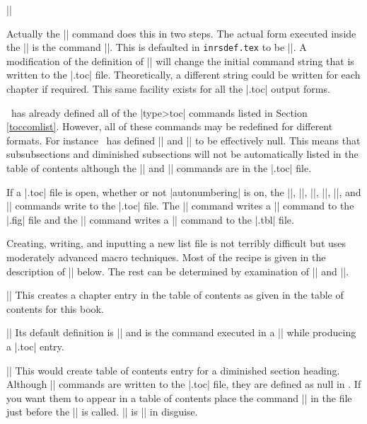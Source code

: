 ||

Actually the |\chead| command does this in two steps. The actual form
executed inside the |\chead| is the command |\chtocout|. This is defaulted in
{\tt inrsdef.tex} to be |\def\chtocout{\string\chtoc}|. A modification of the
definition of |\chtocout| will change the initial command string that is
written to the |.toc| file. Theoretically, a different string could be
written for each chapter if required. This same facility exists for all  the
|.toc| output forms. 

\intex\ has already defined all of the |\<type>toc| commands listed in
Section \ref{toccomlist}. However, all of these commands may be redefined for
different formats. For instance \intex\ has defined |\dssstoc| and |\ssstoc|
to be effectively null. This means that subsubsections and diminished
subsections will not be automatically listed in the table of contents
although the |\ssstoc| and |\dssstoc| commands are in the |.toc| file. 

If a |.toc| file is open, whether or not |autonumbering| is on, the |\chead|,
|\shead|, |\sshead|, |\ssshead|, |\dssshead|, and |\preludehead| commands write to
the |.toc| file. The |\figure| command writes a |\figtoc| command to the
|.fig| file and the |\table| command writes a |\tbltoc| command to the |.tbl|
file. 

Creating, writing, and inputting a new list file is not terribly difficult
but uses moderately advanced macro techniques. Most of the recipe is given 
in the description of |\writelistfile| below. The rest can be determined by
examination of |\makefiglist| and ||. 

\beginblockmode
\ext\@||
\nbr
This creates a chapter entry in the table of contents as given in the table
of contents for this book.

\mbr
\ext\@|\chtocout|
\nbr
Its default definition is
|\def\chtocout{\string\chtoc}| and is 
the command executed in a |\chead| while producing a |.toc| entry. 


\mbr
\ext\@||
\nbr
This would create table of contents entry for a diminished section heading.
Although |\dssshtoc| commands are written to the |\jobname.toc| file, they
are defined as null in \intex. If you want them to appear in a table of
contents place the command |\let\dssshtoc = \intdssshtoc| in the file just
before the |\maketoclist| is called. \@|\intdssshtoc| is |\dssshtoc| in
disguise.

